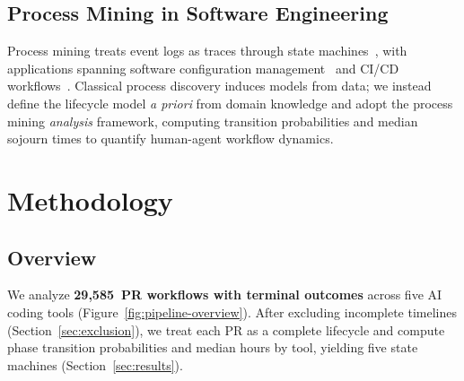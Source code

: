 \documentclass[sigconf]{acmart}
\begin{document}
\subsection{Process Mining in Software Engineering}

Process mining treats event logs as traces through state
machines~\cite{vanderaalst2016process}, with applications spanning
software configuration
management~\cite{rubin2014process,rubin2015system} and
CI/CD workflows~\cite{nogueira2021cicd}.
Classical process discovery induces models from data; we instead
define the lifecycle model \emph{a priori} from domain knowledge
and adopt the process mining \emph{analysis} framework, computing
transition probabilities and median sojourn times to quantify
human-agent workflow dynamics.

\section{Methodology}
\label{sec:methodology}

\subsection{Overview}

We analyze \textbf{29,585~PR workflows with terminal outcomes}
across five AI coding tools
(Figure~\ref{fig:pipeline-overview}).
After excluding incomplete timelines
(Section~\ref{sec:exclusion}), we treat each PR as a complete
lifecycle and compute phase transition probabilities and median
hours by tool, yielding five state machines
(Section~\ref{sec:results}).
\end{document}
